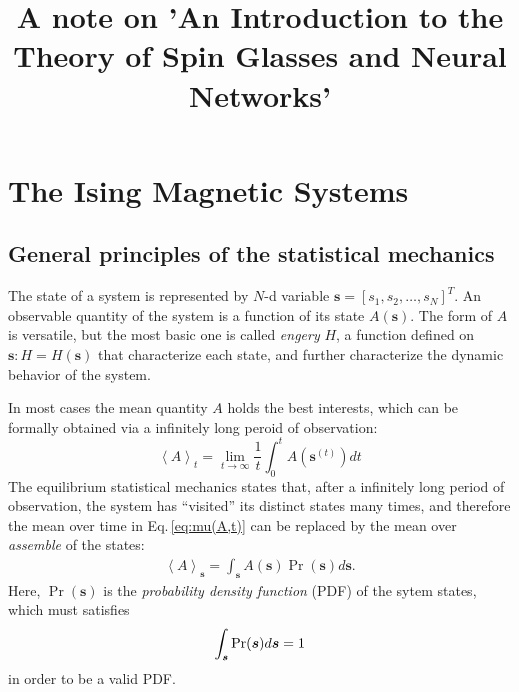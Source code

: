 \documentclass[11pt]{book}
\numberwithin{equation}{chapter}
\newcommand{\bs}{\boldsymbol}
\newcommand{\mean}[2]{\left\langle{#1}\right\rangle_{#2}}
\newcommand{\vs}{\bs{s}}
\begin{document}
\title{A note on 'An Introduction to the Theory of Spin Glasses and Neural Networks'}
\maketitle
{}
\clearpage
\chapter{The Ising Magnetic Systems}
\section{General principles of the statistical mechanics}
The state of a system is represented by $N$-d variable $\vs=[s_1, s_2, \dots, s_N]^T$. An observable quantity of the system is a function of its state $A(\vs)$. The form of $A$ is versatile, but the most basic one is called \textit{engery} $H$, a function defined on $\vs: H = H(\vs)$ that characterize each state, and further characterize the dynamic behavior of the system.

In most cases the mean quantity $A$ holds the best interests, which can be formally obtained via a infinitely long peroid of observation:
\begin{equation} \label{eq:mu(A,t)}
  \mean{A}{t} = \lim_{t \to \infty}\frac{1}{t} \int_0^t A(\vs^{(t)})  dt
\end{equation}
The equilibrium statistical mechanics states that, after a infinitely long period of observation, the system has ``visited'' its distinct states many times, and therefore the mean over time in Eq.\,\eqref{eq:mu(A,t)} can be replaced by the mean over \textit{assemble} of the states:
\begin{align}\label{eq:mu(A,s)}
  \mean{A}{\vs} = \int_{\vs} A(\vs)\Pr(\vs) d\vs.
\end{align}
Here, $\Pr(\vs)$ is the \textit{probability density function} (PDF) of the sytem states, which must satisfies
\begin{align}\label{eq:int_s{p(s)}==1}
  \int_{\vs} \Pr(\vs) d\vs = 1
\end{align}
in order to be a valid PDF.
\end{document}
